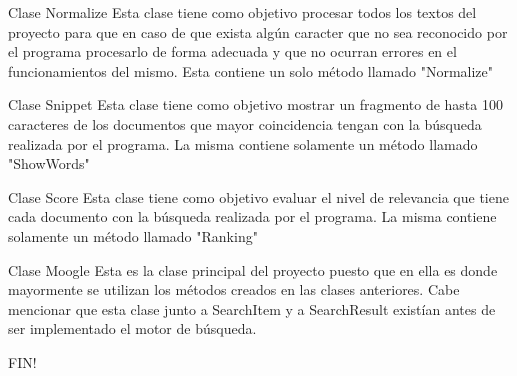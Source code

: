 \documentclass [12pt]{beamer}
\begin{document}
\begin{frame}{Clase Normalize}
Esta clase tiene como objetivo procesar todos los textos del proyecto para que en caso de que exista algún caracter 
que no sea reconocido por el programa procesarlo de forma adecuada y que no ocurran errores en el funcionamientos del mismo. 
Esta contiene un solo método llamado "Normalize"
\end{frame}

\begin{frame}{Clase Snippet}
Esta clase tiene como objetivo mostrar un fragmento de hasta 100 caracteres de los documentos que mayor coincidencia tengan con la 
búsqueda realizada por el programa. La misma contiene solamente un método llamado "ShowWords" 
\end{frame}

\begin{frame}{Clase Score}
Esta clase tiene como objetivo evaluar el nivel de relevancia que tiene cada documento con la búsqueda realizada por el programa.
La misma contiene solamente un método llamado "Ranking"
\end{frame}

\begin{frame}{Clase Moogle}
Esta es la clase principal del proyecto puesto que en ella es donde mayormente se utilizan los métodos creados en las clases anteriores.
Cabe mencionar que esta clase junto a SearchItem y a SearchResult existían antes de ser implementado el motor de búsqueda.
\end{frame}

\begin{frame}
    
\begin{center}
        \huge{FIN!}   
 \end{center}

\end{frame}
    
\end{document}
